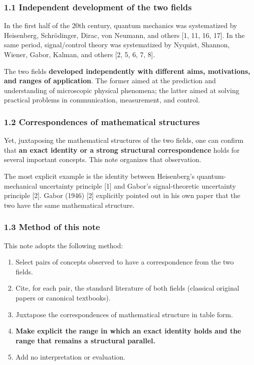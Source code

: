 \documentclass[
]{article}
\providecommand{\tightlist}{%
  \setlength{\itemsep}{0pt}\setlength{\parskip}{0pt}}
\begin{document}
\subsubsection{1.1 Independent development of the two
fields}\label{independent-development-of-the-two-fields}

In the first half of the 20th century, quantum mechanics was
systematized by Heisenberg, Schrödinger, Dirac, von Neumann, and others
{[}1, 11, 16, 17{]}. In the same period, signal/control theory was
systematized by Nyquist, Shannon, Wiener, Gabor, Kalman, and others
{[}2, 5, 6, 7, 8{]}.

The two fields \textbf{developed independently with different aims,
motivations, and ranges of application}. The former aimed at the
prediction and understanding of microscopic physical phenomena; the
latter aimed at solving practical problems in communication,
measurement, and control.

\subsubsection{1.2 Correspondences of mathematical
structures}\label{correspondences-of-mathematical-structures}

Yet, juxtaposing the mathematical structures of the two fields, one can
confirm that \textbf{an exact identity or a strong structural
correspondence} holds for several important concepts. This note
organizes that observation.

The most explicit example is the identity between Heisenberg's
quantum-mechanical uncertainty principle {[}1{]} and Gabor's
signal-theoretic uncertainty principle {[}2{]}. Gabor (1946) {[}2{]}
explicitly pointed out in his own paper that the two have the same
mathematical structure.

\subsubsection{1.3 Method of this note}\label{method-of-this-note}

This note adopts the following method:

\begin{enumerate}
\def\labelenumi{\arabic{enumi}.}
\tightlist
\item
  Select pairs of concepts observed to have a correspondence from the
  two fields.
\item
  Cite, for each pair, the standard literature of both fields (classical
  original papers or canonical textbooks).
\item
  Juxtapose the correspondences of mathematical structure in table form.
\item
  \textbf{Make explicit the range in which an exact identity holds and
  the range that remains a structural parallel.}
\item
  Add no interpretation or evaluation.
\end{enumerate}
\end{document}
